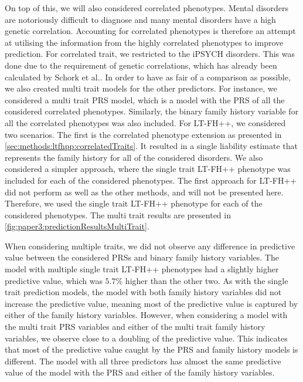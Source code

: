 On top of this, we will also considered correlated phenotypes. Mental disorders are notoriously difficult to diagnose and many mental disorders have a high genetic correlation. Accounting for correlated phenotypes is therefore an attempt at utilising the information from the highly correlated phenotypes to improve prediction. For correlated trait, we restricted to the iPSYCH disorders. This was done due to the requirement of genetic correlations, which has already been calculated by Schork et al.\cite{schork2019genome}. In order to have as fair of a comparison as possible, we also created multi trait models for the other predictors. For instance, we considered a multi trait PRS model, which is a model with the PRS of all the considered correlated phenotypes. Similarly, the binary family history variable for all the correlated phenotypes was also included. For LT-FH++, we considered two scenarios. The first is the correlated phenotype extension as presented in \cref{sec:methods:ltfhpp:correlatedTraits}. It resulted in a single liability estimate that represents the family history for all of the considered disorders. We also considered a simpler approach, where the single trait LT-FH++ phenotype was included for each of the considered phenotypes. The first approach for LT-FH++ did not perform as well as the other methods, and will not be presented here. Therefore, we used the single trait LT-FH++ phenotype for each of the considered phenotypes. The multi trait results are presented in \cref{fig:paper3:predictionResultsMultiTrait}. 



When considering multiple traits, we did not observe any difference in predictive value between the considered PRSs and binary family history variables. The model with multiple single trait LT-FH++ phenotypes had a slightly higher predictive value, which was $ 5.7\% $ higher than the other two. As with the single trait prediction models, the model with both family history variables did not increase the predictive value, meaning most of the predictive value is captured by either of the family history variables. However, when considering a model with the multi trait PRS variables and either of the multi trait family history variables, we observe close to a doubling of the predictive value. This indicates that most of the predictive value caught by the PRS and family history models is different. The model with all three predictors has almost the same predictive value of the model with the PRS and either of the family history variables.


